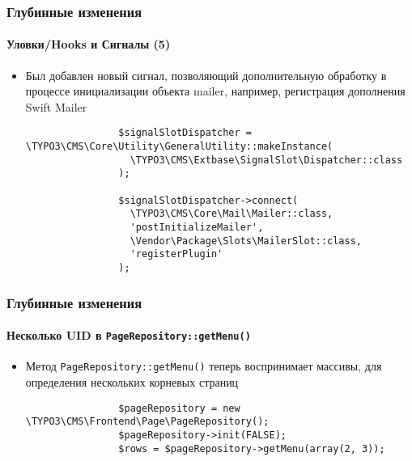 
\begin{frame}[fragile]
	\frametitle{Глубинные изменения}
	\framesubtitle{Уловки/Hooks и Сигналы (5)}

	\lstset{basicstyle=\tiny\ttfamily}

	\begin{itemize}

		\item Был добавлен новый сигнал, позволяющий дополнительную обработку в процессе
			инициализации объекта mailer, например, регистрация дополнения Swift Mailer

			\begin{lstlisting}
				$signalSlotDispatcher = \TYPO3\CMS\Core\Utility\GeneralUtility::makeInstance(
				  \TYPO3\CMS\Extbase\SignalSlot\Dispatcher::class
				);

				$signalSlotDispatcher->connect(
				  \TYPO3\CMS\Core\Mail\Mailer::class,
				  'postInitializeMailer',
				  \Vendor\Package\Slots\MailerSlot::class,
				  'registerPlugin'
				);
		\end{lstlisting}

	\end{itemize}

\end{frame}


\begin{frame}[fragile]
	\frametitle{Глубинные изменения}
	\framesubtitle{Несколько UID в \texttt{PageRepository::getMenu()}}

	\begin{itemize}


		\item Метод \texttt{PageRepository::getMenu()} теперь воспринимает массивы, для 
			определения нескольких корневых страниц

			\begin{lstlisting}
				$pageRepository = new \TYPO3\CMS\Frontend\Page\PageRepository();
				$pageRepository->init(FALSE);
				$rows = $pageRepository->getMenu(array(2, 3));
			\end{lstlisting}

	\end{itemize}

\end{frame}

